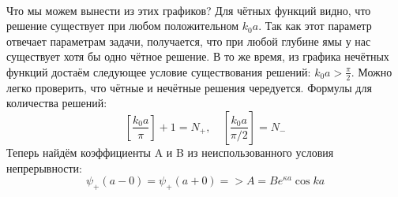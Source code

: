 \begin{figure}[!h]
  \centering
  \hfill
  \caption{}
\end{figure}
\\
Что мы можем вынести из этих графиков? Для чётных функций видно, что решение существует при любом положительном $k_0a$. Так как этот параметр отвечает параметрам задачи, получается, что при любой глубине ямы у нас существует хотя бы одно чётное решение. В то же время, из графика нечётных функций достаём следующее условие существования решений: $k_0a>\frac{\pi}{2}$. Можно легко проверить, что чётные и нечётные решения чередуется. Формулы для количества решений:
\[
[\frac{k_0a}{\pi}] + 1 = N_+,\quad[\frac{k_0a}{\pi/2}] = N_-
\]
Теперь найдём коэффициенты A и B из неиспользованного условия непрерывности:
\[
\psi_+(a-0) = \psi_+(a+0) => A = Be^{\kappa a}\cos ka
\]

